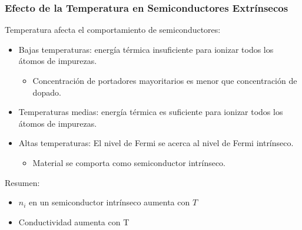 \documentclass[10pt,t,aspectratio=169]{beamer}
\begin{document}
\begin{frame}[t]
  \frametitle{Efecto de la Temperatura en Semiconductores Extrínsecos}

  Temperatura afecta el comportamiento de semiconductores:

  \begin{itemize}
    \item Bajas temperaturas: energía térmica insuficiente para ionizar todos los átomos de impurezas.
    \begin{itemize}
      \item Concentración de portadores mayoritarios es menor que concentración de dopado.
    \end{itemize}
    \item Temperaturas medias: energía térmica es suficiente para ionizar todos los átomos de impurezas.
    \item Altas temperaturas: El nivel de Fermi se acerca al nivel de Fermi intrínseco.
    \begin{itemize}
      \item Material se comporta como semiconductor intrínseco.
    \end{itemize}
  \end{itemize}
  
  Resumen:

  \begin{itemize}
    \item $n_i$ en un semiconductor intrínseco aumenta con $T$
    \item Conductividad aumenta con T
  \end{itemize}
\end{frame}
\end{document}
